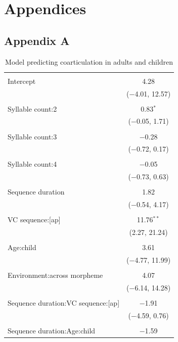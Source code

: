 \documentclass[
]{article}
\begin{document}
\hypertarget{appendices}{%
\section{Appendices}\label{appendices}}

\hypertarget{appendix-a}{%
\subsection{Appendix A}\label{appendix-a}}

\begin{table}[!htbp] \centering 
  \caption{Model predicting coarticulation in adults and children} 
  \label{} 
\begin{tabular}{@{\extracolsep{5pt}}lc} 
\\[-1.8ex]\hline 
\hline \\[-1.8ex] 
 Intercept & 4.28 \\ 
  & ($-$4.01, 12.57) \\ 
  & \\ 
 Syllable count:2 & 0.83$^{*}$ \\ 
  & ($-$0.05, 1.71) \\ 
  & \\ 
 Syllable count:3 & $-$0.28 \\ 
  & ($-$0.72, 0.17) \\ 
  & \\ 
 Syllable count:4 & $-$0.05 \\ 
  & ($-$0.73, 0.63) \\ 
  & \\ 
 Sequence duration & 1.82 \\ 
  & ($-$0.54, 4.17) \\ 
  & \\ 
 VC sequence:[ap] & 11.76$^{**}$ \\ 
  & (2.27, 21.24) \\ 
  & \\ 
 Age:child & 3.61 \\ 
  & ($-$4.77, 11.99) \\ 
  & \\ 
 Environment:across morpheme & 4.07 \\ 
  & ($-$6.14, 14.28) \\ 
  & \\ 
 Sequence duration:VC sequence:[ap] & $-$1.91 \\ 
  & ($-$4.59, 0.76) \\ 
  & \\ 
 Sequence duration:Age:child & $-$1.59 \\ 

\end{tabular}
\end{table}
\end{document}
